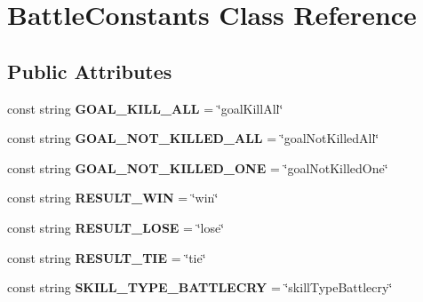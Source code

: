 \hypertarget{class_battle_constants}{}\section{Battle\+Constants Class Reference}
\label{class_battle_constants}
\subsection*{Public Attributes}
\begin{DoxyCompactItemize}
\item 
const string {\bfseries G\+O\+A\+L\+\_\+\+K\+I\+L\+L\+\_\+\+A\+LL} = \char`\"{}goal\+Kill\+All\char`\"{}\hypertarget{class_battle_constants_a47998b80519780a64ca619aa6368e80b}{}\label{class_battle_constants_a47998b80519780a64ca619aa6368e80b}

\item 
const string {\bfseries G\+O\+A\+L\+\_\+\+N\+O\+T\+\_\+\+K\+I\+L\+L\+E\+D\+\_\+\+A\+LL} = \char`\"{}goal\+Not\+Killed\+All\char`\"{}\hypertarget{class_battle_constants_ad7094608022872e4bceb6ec78f5f90c5}{}\label{class_battle_constants_ad7094608022872e4bceb6ec78f5f90c5}

\item 
const string {\bfseries G\+O\+A\+L\+\_\+\+N\+O\+T\+\_\+\+K\+I\+L\+L\+E\+D\+\_\+\+O\+NE} = \char`\"{}goal\+Not\+Killed\+One\char`\"{}\hypertarget{class_battle_constants_a61947519a0cd159e4fff7c19d9653491}{}\label{class_battle_constants_a61947519a0cd159e4fff7c19d9653491}

\item 
const string {\bfseries R\+E\+S\+U\+L\+T\+\_\+\+W\+IN} = \char`\"{}win\char`\"{}\hypertarget{class_battle_constants_aea3fac4e89eae2432e2c2c32b96f20bd}{}\label{class_battle_constants_aea3fac4e89eae2432e2c2c32b96f20bd}

\item 
const string {\bfseries R\+E\+S\+U\+L\+T\+\_\+\+L\+O\+SE} = \char`\"{}lose\char`\"{}\hypertarget{class_battle_constants_a0d100ec2419f8ef66255f9d33c2dbc20}{}\label{class_battle_constants_a0d100ec2419f8ef66255f9d33c2dbc20}

\item 
const string {\bfseries R\+E\+S\+U\+L\+T\+\_\+\+T\+IE} = \char`\"{}tie\char`\"{}\hypertarget{class_battle_constants_a217fa60721a6ecd477b915f9354b6cce}{}\label{class_battle_constants_a217fa60721a6ecd477b915f9354b6cce}

\item 
const string {\bfseries S\+K\+I\+L\+L\+\_\+\+T\+Y\+P\+E\+\_\+\+B\+A\+T\+T\+L\+E\+C\+RY} = \char`\"{}skill\+Type\+Battlecry\char`\"{}\hypertarget{class_battle_constants_a0f57aac5ec067ef1c27e4822a461dee5}{}\label{class_battle_constants_a0f57aac5ec067ef1c27e4822a461dee5}


\end{DoxyCompactItemize}
